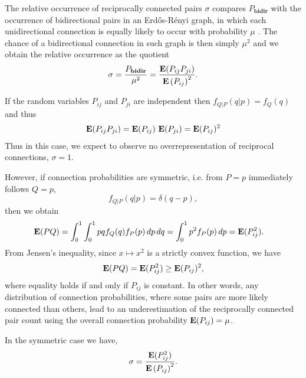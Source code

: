 The relative occurrence of reciprocally connected pairs $\sigma$ compares $P_{\mathbf{bidir}}$ with the occurrence of bidirectional pairs in an Erd\H{o}s-R\'{e}nyi graph, in which each unidirectional connection is equally likely to occur with probability $\mu$ \cite{Gilbert1959, Erdos1959}. The chance of a bidirectional connection in such graph is then simply $\mu^2$ and we obtain the relative occurrence as the quotient
\begin{align}
\sigma = \frac{P_{\mathbf{bidir}}}{\mu^2} = \frac{\operatorname{\mathbf{E}}(P_{ij}P_{ji})}{{\operatorname{\mathbf{E}}\left(P_{ij}\right)}^2}.
\end{align}



If the random variables $P_{ij}$ and $P_{ji}$ are independent then $f_{Q|P}(q|p) = f_Q(q)$ and thus
\begin{align}
\operatorname{\mathbf{E}}(P_{ij} P_{ji}) = \operatorname{\mathbf{E}}(P_{ij})\,\operatorname{\mathbf{E}}(P_{ji}) = \operatorname{\mathbf{E}}(P_{ij})^2
\end{align}
Thus in this case, we expect to observe no overrepresentation of reciprocal connections, $\sigma = 1$.

However, if connection probabilities are symmetric, i.e. from $P = p$ immediately follows $Q=p$,
\[
f_{Q|P}(q|p) = \delta(q-p),
\]
then we obtain
%
\begin{align*}
\operatorname{\mathbf{E}}(PQ) & = \int_0^1 \int_0^1 pq f_{Q}(q) f_{P}(p) \,dp\,dq = \int_0^1 p^2  f_{P}(p) \,dp =  \operatorname{\mathbf{E}}(P_{ij}^2).
\end{align*}
%
From Jensen's inequality, since $x \mapsto x^2$ is a strictly convex function, we have
%
\[
\operatorname{\mathbf{E}}(PQ) = \operatorname{\mathbf{E}}(P_{ij}^2) \geq \operatorname{\mathbf{E}}(P_{ij})^2,
\]
where equality holds if and only if $P_{ij}$ is constant. In other words, any distribution of connection probabilities, where some pairs are more likely connected than others, lead to an underestimation of the reciprocally connected pair count using the overall connection probability $\operatorname{\mathbf{E}}(P_{ij}) = \mu$.

In the symmetric case we have,
\[
\sigma = \frac{\operatorname{\mathbf{E}}(P_{ij}^2)}{{\operatorname{\mathbf{E}}\left(P_{ij}\right)}^2}.
\]




